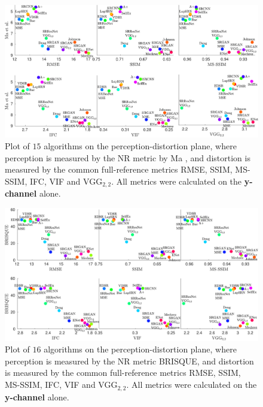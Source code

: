 \begin{figure}
	\begin{center}
		\includegraphics[width=\linewidth]{supp_figures/Ma_plots.pdf}
	\end{center}
	\caption{Plot of $15$ algorithms on the perception-distortion plane, where perception is measured by the NR metric by Ma \etal \cite{ma2017learning}, and distortion is measured by the common full-reference metrics RMSE, SSIM, MS-SSIM, IFC, VIF and VGG$_{2,2}$. All metrics were calculated on the \textbf{y-channel} alone.}
	\label{fig:noRefMethods3}
\end{figure}

\begin{figure}
	\begin{center}
		\includegraphics[width=\linewidth]{supp_figures/BRISQUE.pdf}
	\end{center}
	\caption{Plot of $16$ algorithms on the perception-distortion plane, where perception is measured by the NR metric BRISQUE, and distortion is measured by the common full-reference metrics RMSE, SSIM, MS-SSIM, IFC, VIF and VGG$_{2,2}$. All metrics were calculated on the \textbf{y-channel} alone.}
	\label{fig:noRefMethods4}
\end{figure}

